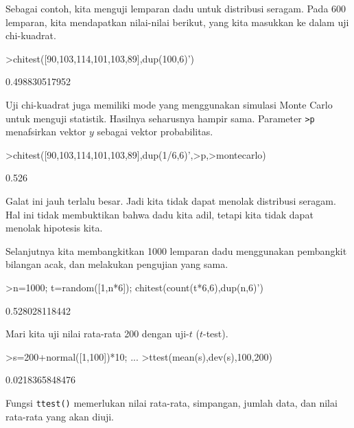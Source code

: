 \documentclass[a4paper,11pt,oneside,enabledeprecatedfontcommands]{scrbook}
\newenvironment{eulernotebook}{}{}
\newenvironment{eulercomment}{\par\medskip\noindent}{\par\medskip}
\begin{document}
\begin{eulernotebook}
\begin{eulercomment}
			Sebagai contoh, kita menguji lemparan dadu untuk distribusi seragam. Pada 600 lemparan, kita
			mendapatkan nilai-nilai berikut, yang kita masukkan ke dalam uji chi-kuadrat.
		\end{eulercomment}
		\begin{eulerprompt}
			>chitest([90,103,114,101,103,89],dup(100,6)')
		\end{eulerprompt}
		\begin{euleroutput}
			0.498830517952
		\end{euleroutput}
		\begin{eulercomment}
			Uji chi-kuadrat juga memiliki mode yang menggunakan simulasi Monte Carlo untuk menguji statistik.
			Hasilnya seharusnya hampir sama. Parameter \texttt{>p} menafsirkan vektor $y$ sebagai vektor probabilitas.
		\end{eulercomment}
		\begin{eulerprompt}
			>chitest([90,103,114,101,103,89],dup(1/6,6)',>p,>montecarlo)
		\end{eulerprompt}
		\begin{euleroutput}
			0.526
		\end{euleroutput}
		\begin{eulercomment}
			Galat ini jauh terlalu besar. Jadi kita tidak dapat menolak distribusi seragam. Hal ini tidak
			membuktikan bahwa dadu kita adil, tetapi kita tidak dapat menolak hipotesis kita.
			
			Selanjutnya kita membangkitkan 1000 lemparan dadu menggunakan pembangkit bilangan acak, dan melakukan
			pengujian yang sama.
		\end{eulercomment}
		\begin{eulerprompt}
			>n=1000; t=random([1,n*6]); chitest(count(t*6,6),dup(n,6)')
		\end{eulerprompt}
		\begin{euleroutput}
			0.528028118442
		\end{euleroutput}
		\begin{eulercomment}
			Mari kita uji nilai rata-rata 200 dengan uji-$t$ ($t$-test).
		\end{eulercomment}
		\begin{eulerprompt}
			>s=200+normal([1,100])*10; ...
			>ttest(mean(s),dev(s),100,200)
		\end{eulerprompt}
		\begin{euleroutput}
			0.0218365848476
		\end{euleroutput}
		\begin{eulercomment}
			Fungsi \texttt{ttest()} memerlukan nilai rata-rata, simpangan, jumlah data, dan nilai rata-rata yang akan
			diuji.
			

\end{eulercomment}
\end{eulernotebook}
\end{document}
